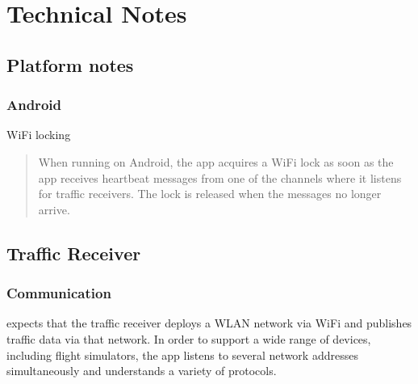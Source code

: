 \documentclass[letterpaper,10pt,english]{sphinxmanual}
\begin{document}
\chapter{Technical Notes}
\label{\detokenize{04-appendix/technical:technical-notes}}\label{\detokenize{04-appendix/technical::doc}}

\section{Platform notes}
\label{\detokenize{04-appendix/technical:platform-notes}}

\subsection{Android}
\label{\detokenize{04-appendix/technical:android}}
\sphinxAtStartPar
Wi\sphinxhyphen{}Fi locking
\begin{quote}

\sphinxAtStartPar
When running on Android, the app acquires a Wi\sphinxhyphen{}Fi lock as soon as the app
receives heartbeat messages from one of the channels where it listens for
traffic receivers.  The lock is released when the messages no longer arrive.
\end{quote}


\section{Traffic Receiver}
\label{\detokenize{04-appendix/technical:traffic-receiver}}

\subsection{Communication}
\label{\detokenize{04-appendix/technical:communication}}
\sphinxAtStartPar
{} expects that the traffic receiver deploys a WLAN
network via Wi\sphinxhyphen{}Fi and publishes traffic data via that network.  In order to
support a wide range of devices, including flight simulators, the app listens to
several network addresses simultaneously and understands a variety of protocols.
\end{document}
